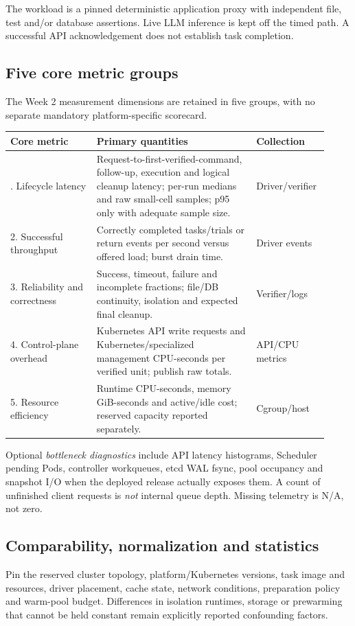 \documentclass[
  a4paper,
]{article}
\begin{document}
The workload is a pinned deterministic
application proxy with independent file,
test and/or database assertions. Live
LLM inference is kept off the timed path.
A successful API acknowledgement does
not establish task completion.

\subsection{Five core metric groups}\label{metric-definitions}
The Week 2 measurement dimensions are
retained in five groups, with no separate
mandatory platform-specific scorecard.

{\small
\begin{longtable}{@{}p{0.26\linewidth}p{0.48\linewidth}p{0.18\linewidth}@{}}
\toprule
Core metric & Primary quantities & Collection\\
\midrule
\endhead
\bottomrule
\endlastfoot
1. Lifecycle latency &
Request-to-first-verified-command, follow-up,
execution and logical cleanup latency;
per-run medians and raw small-cell samples;
p95 only with adequate sample size. &
Driver/verifier\\
2. Successful throughput &
Correctly completed tasks/trials or
return events per second versus
offered load; burst drain time. &
Driver events\\
3. Reliability and correctness &
Success, timeout, failure and incomplete
fractions; file/DB continuity, isolation
and expected final cleanup. &
Verifier/logs\\
4. Control-plane overhead &
Kubernetes API write requests and
Kubernetes/specialized management
CPU-seconds per verified unit;
publish raw totals. &
API/CPU metrics\\
5. Resource efficiency &
Runtime CPU-seconds, memory GiB-seconds
and active/idle cost; reserved
capacity reported separately. &
Cgroup/host\\
\end{longtable}
}

Optional \emph{bottleneck diagnostics}
include API latency histograms,
Scheduler pending Pods, controller
workqueues, etcd WAL fsync, pool
occupancy and snapshot I/O when
the deployed release actually exposes
them. A count of unfinished client
requests is \emph{not} internal queue
depth. Missing telemetry is N/A,
not zero.

\subsection{Comparability, normalization and statistics}
Pin the reserved cluster topology,
platform/Kubernetes versions,
task image and resources, driver
placement, cache state, network
conditions, preparation policy
and warm-pool budget. Differences
in isolation runtimes, storage or
prewarming that cannot be held
constant remain explicitly
reported confounding factors.
\end{document}
